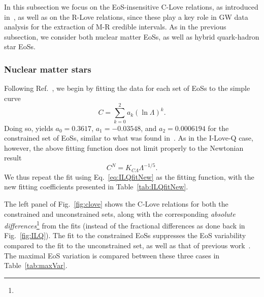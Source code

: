 \documentclass[prd,twocolumn,nofootinbib,superscriptaddress,amsmath,amssymb]{revtex4-1}
\begin{document}
In this subsection we focus on the EoS-insensitive C-Love relations, as introduced in~\cite{Yagi:2013bca,Yagi:ILQ,Maselli:2013mva}, as well as on the R-Love relations, since these play a key role in GW data analysis for the extraction of M-R credible intervals. As in the previous subsection, we consider both nuclear matter EoSs, as well as hybrid quark-hadron star EoSs.

\subsubsection{Nuclear matter stars}
\label{sec:clove-nuc}


Following Ref.~\cite{Maselli:2013mva}, we begin by fitting the data for each set of EoSs to the simple curve
\begin{equation}
C = \sum^2_{k=0} a_k (\ln{\Lambda})^k.
\end{equation}
Doing so, yields $a_0 = 0.3617$, $a_1 = -0.03548$, and $a_2 = 0.0006194$ for the constrained set of EoSs, similar to what was found in~\cite{Maselli:2013mva}. As in the I-Love-Q case, however, the above fitting function does not limit properly to the Newtonian result 
\begin{equation}
C^N=K_{C\Lambda}\Lambda^{-1/5}.\label{eq:cloveFit}
\end{equation}
We thus repeat the fit using Eq.~\eqref{eq:ILQfitNew} as the fitting function, with the new fitting coefficients presented in Table~\ref{tab:ILQfitNew}.

The left panel of Fig.~\ref{fig:clove} shows the C-Love relations for both the constrained and unconstrained sets, along with the corresponding \emph{absolute differences}\footnote{} from the fits (instead of the fractional differences as done back in Fig.~\ref{fig:ILQ}). The fit to the constrained EoSs suppresses the EoS variability compared to the fit to the unconstrained set, as well as that of previous work~\cite{Maselli:2013mva}. The maximal EoS variation is compared between these three cases in Table~\ref{tab:maxVar}.
\end{document}
